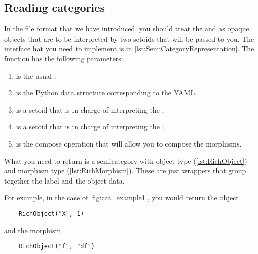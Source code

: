 \vfill
\pagebreak


\subsection{Reading categories}

In the file format that we have introduced, you should treat the  and  as opaque objects that are to be interpreted by two setoids that will be passed to you.
The interface hat you need to implement is in \cref{lst:SemiCategoryRepresentation}.
The function  has the following parameters:
\begin{enumerate}
    \item {} is the usual ;
    \item {} is the Python data structure corresponding to the YAML.
    \item {} is a setoid that is in charge of interpreting the ;
    \item {} is a setoid that is in charge of interpreting the ;
    \item {} is the compose operation that will allow you to compose the morphisms.
\end{enumerate}
What you need to return is a semicategory with object type  (\cref{lst:RichObject}) and morphism type  (\cref{lst:RichMorphism}).
These are just wrappers that group together the label and the object data.



For example, in the case of \cref{fig:cat_example1}, you would return the object
\begin{verbatim}
    RichObject("X", 1)
\end{verbatim}
and the morphism
\begin{verbatim}
    RichObject("f", "df")
\end{verbatim}

